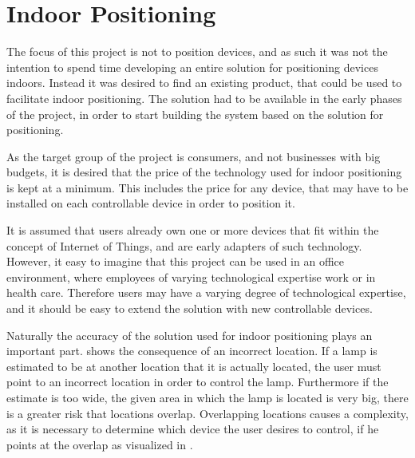 \section{Indoor Positioning}\label{sec:analysis:indoor-positioning}

The focus of this project is not to position devices, 
and as such it was not the intention to spend time developing an entire solution for positioning devices indoors. 
Instead it was desired to find an existing product, 
that could be used to facilitate indoor positioning.
The solution had to be available in the early phases of the project, 
in order to start building the system based on the solution for positioning.

As the target group of the project is consumers, 
and not businesses with big budgets, 
it is desired that the price of the technology used for indoor positioning is kept at a minimum. 
This includes the price for any device, 
that may have to be installed on each controllable device in order to position it.

It is assumed that users already own one or more devices that fit within the concept of Internet of Things, 
and are early adapters of such technology. 
However, it easy to imagine that this project can be used in an office environment, 
where employees of varying technological expertise work or in health care. 
Therefore users may have a varying degree of technological expertise, 
and it should be easy to extend the solution with new controllable devices.

Naturally the accuracy of the solution used for indoor positioning plays an important part. 
 shows the consequence of an incorrect location. 
If a lamp is estimated to be at another location that it is actually located, 
the user must point to an incorrect location in order to control the lamp.
Furthermore if the estimate is too wide, 
\ie the given area in which the lamp is located is very big, 
there is a greater risk that locations overlap. 
Overlapping locations causes a complexity, 
as it is necessary to determine which device the user desires to control, 
if he points at the overlap as visualized in .


